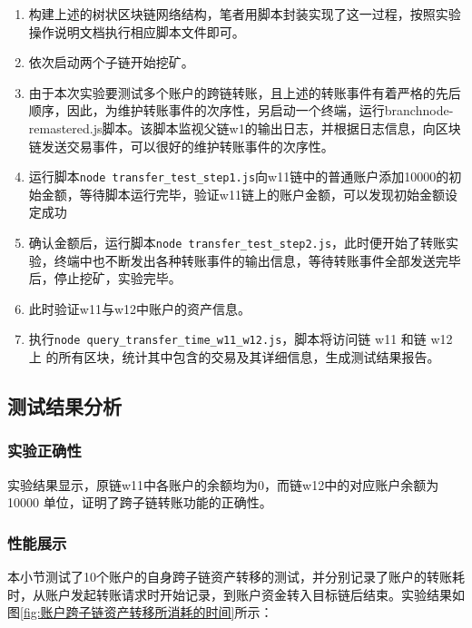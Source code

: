 \begin{enumerate}
    \item 构建上述的树状区块链网络结构，笔者用脚本封装实现了这一过程，按照实验操作说明文档执行相应脚本文件即可。
    \item 依次启动两个子链开始挖矿。
    \item 由于本次实验要测试多个账户的跨链转账，且上述的转账事件有着严格的先后顺序，因此，为维护转账事件的次序性，另启动一个终端，运行branchnode-remastered.js脚本。该脚本监视父链w1的输出日志，并根据日志信息，向区块链发送交易事件，可以很好的维护转账事件的次序性。
    \item 运行脚本\verb|node transfer_test_step1.js|向w11链中的普通账户添加10000的初始金额，等待脚本运行完毕，验证w11链上的账户金额，可以发现初始金额设定成功
    \item 确认金额后，运行脚本\verb|node transfer_test_step2.js|，此时便开始了转账实验，终端中也不断发出各种转账事件的输出信息，等待转账事件全部发送完毕后，停止挖矿，实验完毕。
    \item 此时验证w11与w12中账户的资产信息。
    \item 执行\verb|node query_transfer_time_w11_w12.js|，脚本将访问链 w11 和链 w12 上
    的所有区块，统计其中包含的交易及其详细信息，生成测试结果报告。
\end{enumerate}

\subsection{测试结果分析 }

\subsubsection{实验正确性}

实验结果显示，原链w11中各账户的余额均为0，而链w12中的对应账户余额为10000 单位，证明了跨子链转账功能的正确性。

\subsubsection{性能展示}

本小节测试了10个账户的自身跨子链资产转移的测试，并分别记录了账户的转账耗时，从账户发起转账请求时开始记录，到账户资金转入目标链后结束。实验结果如图\ref{fig:账户跨子链资产转移所消耗的时间}所示：

